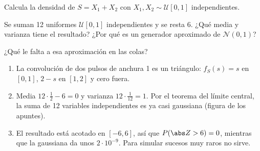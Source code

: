 \documentclass[11pt,a4paper]{scrartcl}
\begin{document}
\begin{ejercicio}
  \begin{incisos}[1]
    \item Calcula la densidad de $S=X_1+X_2$ con $X_1,X_2\sim\mathcal U[0,1]$ independientes.
    \item Se suman 12 uniformes $\mathcal U[0,1]$ independientes y se resta 6. ¿Qué media y varianza tiene el resultado? ¿Por qué es un generador aproximado de $\mathcal N(0,1)$?
    \item ¿Qué le falta a esa aproximación en las colas?
  \end{incisos}
\end{ejercicio}
\begin{solucion}
  \begin{enumerate}[label=\alph*)]
    \item La convolución de dos pulsos de anchura 1 es un triángulo: $f_S(s)=s$ en $[0,1]$, $2-s$ en $[1,2]$ y cero fuera.
    \item Media $12\cdot\frac12-6=0$ y varianza $12\cdot\frac1{12}=1$. Por el teorema del límite central, la suma de 12 variables independientes es ya casi gaussiana (figura de los apuntes).
    \item El resultado está acotado en $[-6,6]$, así que $P(\abs Z>6)=0$, mientras que la gaussiana da unos $2\cdot10^{-9}$. Para simular sucesos muy raros no sirve.
  \end{enumerate}
\end{solucion}
\end{document}
